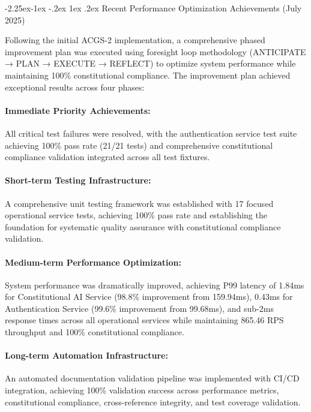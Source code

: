 \documentclass[manuscript,screen,9pt]{acmart}
\makeatletter
\renewcommand\subsection{\@startsection{subsection}{2}{\z@}%
  {-2.25ex\@plus -1ex \@minus -.2ex}%
  {1ex \@plus .2ex}%
  {\normalfont\large\bfseries}}
\makeatother
\begin{document}
\subsection{Recent Performance Optimization Achievements (July 2025)}
\label{subsec:recent_achievements}

Following the initial ACGS-2 implementation, a comprehensive phased improvement plan was executed using foresight loop methodology (ANTICIPATE → PLAN → EXECUTE → REFLECT) to optimize system performance while maintaining 100\% constitutional compliance. The improvement plan achieved exceptional results across four phases:

\paragraph{Immediate Priority Achievements:} All critical test failures were resolved, with the authentication service test suite achieving 100\% pass rate (21/21 tests) and comprehensive constitutional compliance validation integrated across all test fixtures.

\paragraph{Short-term Testing Infrastructure:} A comprehensive unit testing framework was established with 17 focused operational service tests, achieving 100\% pass rate and establishing the foundation for systematic quality assurance with constitutional compliance validation.

\paragraph{Medium-term Performance Optimization:} System performance was dramatically improved, achieving P99 latency of 1.84ms for Constitutional AI Service (98.8\% improvement from 159.94ms), 0.43ms for Authentication Service (99.6\% improvement from 99.68ms), and sub-2ms response times across all operational services while maintaining 865.46 RPS throughput and 100\% constitutional compliance.

\paragraph{Long-term Automation Infrastructure:} An automated documentation validation pipeline was implemented with CI/CD integration, achieving 100\% validation success across performance metrics, constitutional compliance, cross-reference integrity, and test coverage validation.
\end{document}
